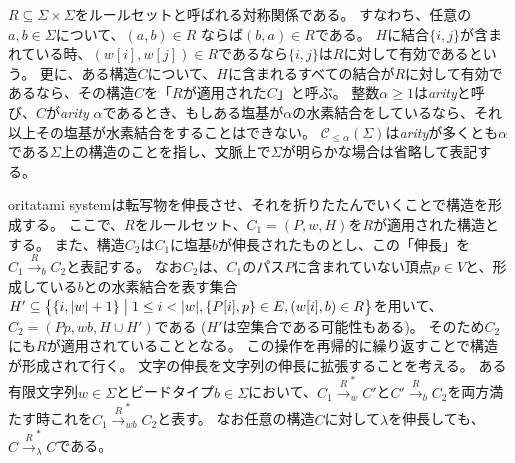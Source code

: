 \documentclass[a4,11pt]{article}
\begin{document}
$R \subseteq \Sigma \times \Sigma$をルールセットと呼ばれる対称関係である。
すなわち、任意の$a, b \in \Sigma$について、$(a, b) \in R$ ならば$(b, a) \in R$である。
$H$に結合$\{i,j\}$が含まれている時、$(w[i],w[j]) \in R$であるなら$\{i,j\}$は$R$に対して有効であるという。
更に、ある構造$C$について、$H$に含まれるすべての結合が$R$に対して有効であるなら、その構造$C$を「$R$が適用された$C$」と呼ぶ。
整数$\alpha \ge 1$は\textit{arity}と呼び、$C$が\textit{arity} $\alpha$であるとき、もしある塩基が$\alpha$の水素結合をしているなら、それ以上その塩基が水素結合をすることはできない。
$\mathcal{C}_{\le \alpha}(\Sigma)$は\textit{arity}が多くとも$\alpha$である$\Sigma$上の構造のことを指し、文脈上で$\Sigma$が明らかな場合は省略して表記する。


oritatami systemは転写物を伸長させ、それを折りたたんでいくことで構造を形成する。
ここで、$R$をルールセット、$C_1 = (P, w, H)$を$R$が適用された構造とする。
また、構造$C_2$は$C_1$に塩基$b$が伸長されたものとし、この「伸長」を$C_1 \xrightarrow{R}_b C_2$と表記する。
なお$C_2$は、$C_1$のパス$P$に含まれていない頂点$p \in V$と、形成している$b$との水素結合を表す集合$H' \subseteq \bigl\{ \{i, |w|+1\} \bigm| 1 \le i < |w|, \{P[i], p\} \in E, (w[i], b) \in R \bigr\}$を用いて、$C_2 = (P p, wb, H \cup H')$である ($H'$は空集合である可能性もある)。
そのため$C_2$にも$R$が適用されていることとなる。
この操作を再帰的に繰り返すことで構造が形成されて行く。
文字の伸長を文字列の伸長に拡張することを考える。
ある有限文字列$w \in \Sigma$とビードタイプ$b \in \Sigma$において、$C_1 \xrightarrow{R}_w^* C'$と$C' \xrightarrow{R}_b C_2$を両方満たす時これを$C_1 \xrightarrow{R}_{wb}^* C_2$と表す。
なお任意の構造$C$に対して$\lambda$を伸長しても、$C \xrightarrow{R}_\lambda^* C$である。
\end{document}
